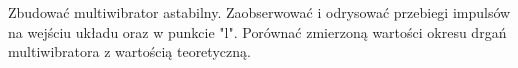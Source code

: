 \section{}
Zbudować multiwibrator astabilny.
Zaobserwować i odrysować przebiegi impulsów na wejściu układu oraz w punkcie "l".
Porównać zmierzoną wartości okresu drgań multiwibratora z wartością teoretyczną.